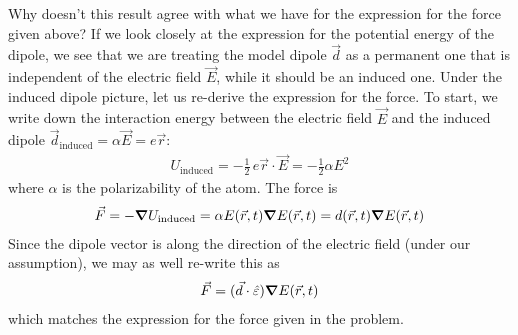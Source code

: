 \documentclass{article}
\theoremstyle{definition}
\newcommand{\al}{\alpha}
\newcommand{\f}[2]{\frac{#1}{#2}}
\begin{document}
\begin{enumerate}[label=\alph*)]
	Why doesn't this result agree with what we have for the expression for the force given above?  If we look closely at the expression for the potential energy of the dipole, we see that we are treating the model dipole $\vec{d}$ as a permanent one that is independent of the electric field $\vec{E}$, while it should be an induced one.  Under the induced dipole picture, let us re-derive the expression for the force.  To start, we write down the interaction energy between the electric field $\vec{E}$ and the induced dipole $\vec{d}_\text{induced} = \alpha \vec{E} = e \vec{r}$:
	\begin{align*}
	U_\text{induced} = -\f{1}{2} \, e \vec{r} \cdot \vec{E} =  -\f{1}{2} \alpha E^2 
	\end{align*}
	where $\alpha$ is the polarizability of the atom. The force is  
	\begin{align*}
	\vec{F}= - \grad U_\text{induced} = \al E(\vec{r},t) \grad E(\vec{r},t) = d(\vec{r},t) \grad E(\vec{r},t)
	\end{align*}
	Since the dipole vector is along the direction of the electric field (under our assumption), we may as well re-write this as 
	\begin{align*}
	\vec{F} = (\vec{d} \cdot \hat{\varepsilon}) \grad E(\vec{r},t)
	\end{align*}
	which matches the expression for the force given in the problem. 
	

\end{enumerate}
\end{document}

